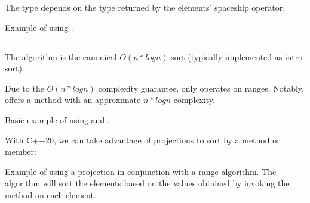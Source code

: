 The type depends on the type returned by the elements' spaceship operator.


\begin{codebox}[]{\href{https://compiler-explorer.com/z/vrEqPaEEz}{\ExternalLink}}
\footnotesize Example of using .
\tcblower
{}
\end{codebox}

\subsection{\texorpdfstring{}{\texttt{std::sort}}}

The  algorithm is the canonical $O(n*logn)$ sort (typically implemented as intro-sort).


Due to the $O(n*logn)$ complexity guarantee,  only operates on  ranges. Notably,  offers a method with an approximate $n*logn$ complexity.

\begin{codebox}[]{\href{https://compiler-explorer.com/z/vef61TWj9}{\ExternalLink}}
\footnotesize Basic example of using  and .
\tcblower
{}
\end{codebox}

With C++20, we can take advantage of projections to sort by a method or member:

\begin{codebox}[breakable]{\href{https://compiler-explorer.com/z/4aGenq9b6}{\ExternalLink}}
\footnotesize Example of using a projection in conjunction with a range algorithm. The algorithm will sort the elements based on the values obtained by invoking the method  on each element.
\tcblower
{}
\end{codebox}

